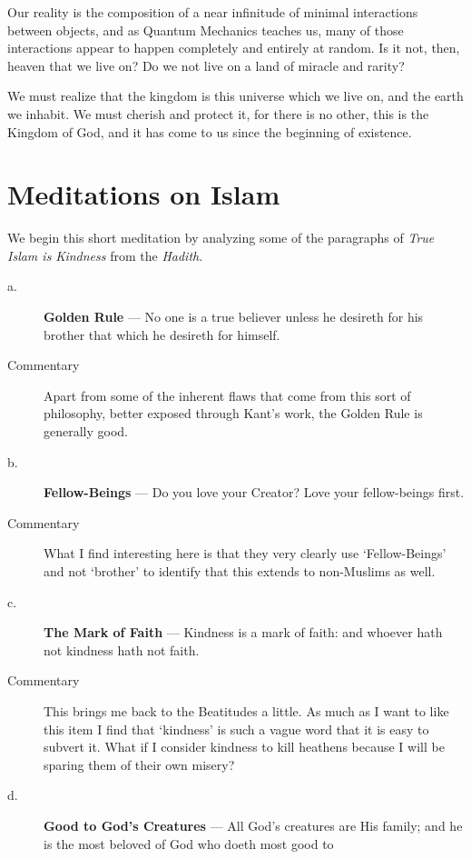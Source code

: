 \documentclass[12pt,letterpaper]{article}
\begin{document}
\begin{spacing}{2}
    Our reality is the composition of a near infinitude of minimal interactions
    between objects, and as Quantum Mechanics teaches us, many of those
    interactions appear to happen completely and entirely at random. Is it not,
    then, heaven that we live on? Do we not live on a land of miracle and
    rarity?

    We must realize that the kingdom is this universe which we live on, and the
    earth we inhabit. We must cherish and protect it, for there is no other,
    this is the Kingdom of God, and it has come to us since the beginning of
    existence.

    \newpage
    \section{Meditations on Islam}
    We begin this short meditation by analyzing some of the paragraphs of
    \emph{True Islam is Kindness} from the \emph{Hadith}.
    \begin{description}
        \item[a.] \textbf{Golden Rule} --- No one is a true believer unless he
            desireth for his brother that which he desireth for himself.
        \item[Commentary] Apart from some of the inherent flaws that come from
            this sort of philosophy, better exposed through Kant's work, the
            Golden Rule is generally good.
        \item[b.] \textbf{Fellow-Beings} --- Do you love your Creator? Love your
            fellow-beings first.
        \item[Commentary] What I find interesting here is that they very clearly
            use `Fellow-Beings' and not `brother' to identify that this extends
            to non-Muslims as well.
        \item[c.] \textbf{The Mark of Faith} --- Kindness is a mark of faith:
            and whoever hath not kindness hath not faith.
        \item[Commentary] This brings me back to the Beatitudes a little. As
            much as I want to like this item I find that `kindness' is such a
            vague word that it is easy to subvert it. What if I consider
            kindness to kill heathens because I will be sparing them of their
            own misery?
        \item[d.] \textbf{Good to God's Creatures} --- All God's creatures are
            His family; and he is the most beloved of God who doeth most good to

\end{description}
\end{spacing}
\end{document}
